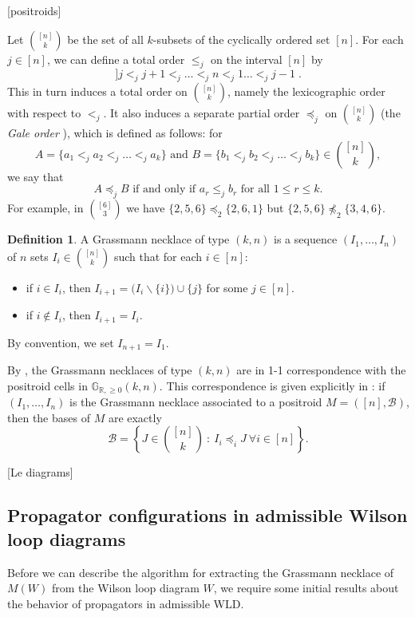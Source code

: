 \documentclass[11pt]{article}
\newcommand{\R}{\mathbb{R}}
\newcommand{\Gr}{\mathbb{G}_{\R, \geq 0}}
\newcommand{\cB}{\mathcal{B}}
\newcommand{\gale}[1]{\preccurlyeq_{#1}}
\theoremstyle{remark}
\theoremstyle{definition}
\newtheorem{dfn}[thm]{Definition}
\begin{document}
[positroids]

Let $\binom{[n]}{k}$ be the set of all $k$-subsets of the cyclically ordered set $[n]$.  For each $j \in [n]$, we can define a total order $\leq_j$ on the interval $[n]$ by
\[] j <_j j+1 <_j \dots <_j n <_j 1 \dots <_j j-1\;.\]
This in turn induces a total order on $\binom{[n]}{k}$, namely the lexicographic order with respect to $<_j$.  It also induces a separate partial order $\gale{j}$ on $\binom{[n]}{k}$ (the \textit{Gale order} \cite{Gale}), which is defined as follows: for 
\[A = \{a_1 <_j a_2 <_j \dots <_j a_k\} \text{ and } B = \{b_1 <_j b_2 <_j \dots <_j b_k\} \in \binom{[n]}{k},\] we say that
\[A \gale{j} B \text{ if and only if } a_r \leq_j b_r \text{ for all }1 \leq r \leq k.\]
For example, in $\binom{[6]}{3}$ we have $\{2,5,6\}\gale{2} \{2,6,1\}$ but $\{2,5,6\}\not\gale{2}\{3,4,6\}$.


\begin{dfn}\label{def:grassmann necklace}
A Grassmann necklace of type $(k,n)$ is a sequence $(I_1, \dots, I_n)$ of $n$ sets $I_i \in \binom{[n]}{k}$ such that for each $i \in [n]$:
\begin{itemize}
\item if $i \in I_i$, then $I_{i+1} = \big(I_i \backslash \{i\}\big) \cup \{j\}$ for some $j \in[n]$.
\item if $i \not\in I_i$, then $I_{i+1} = I_i$.
\end{itemize}
By convention, we set $I_{n+1} = I_1$.
\end{dfn}

By \cite[Theorem 17.1]{Postnikov}, the Grassmann necklaces of type $(k,n)$ are in 1-1 correspondence with the positroid cells in $\Gr(k,n)$.  This correspondence is given explicitly in \cite[Theorem 8]{Oh}: if $(I_1, \dots, I_n)$ is the Grassmann necklace associated to a positroid $M = ([n],\cB)$, then the bases of $M$ are exactly
\[\cB = \left\{J \in \binom{[n]}{k}\ :\ I_i \gale{i} J \ \forall i \in [n]\right\}.\]


[Le diagrams]


\subsection{Propagator configurations in admissible Wilson loop diagrams}\label{sec:propagator configs}

Before we can describe the algorithm for extracting the Grassmann necklace of $M(W)$ from the Wilson loop diagram $W$, we require some initial results about the behavior of propagators in admissible WLD.
\end{document}
